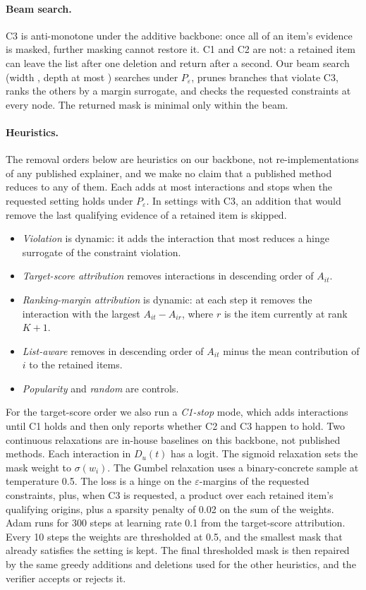 \documentclass[11pt]{article}
\newcommand{\Peps}{P_\varepsilon}
\begin{document}
\paragraph{Beam search.} C3 is anti-monotone under the additive backbone: once all of an item's evidence is masked,
further masking cannot restore it. C1 and C2 are not: a retained item can leave the list after one deletion and
return after a second. Our beam search (width \BeamWidth, depth at most \BeamDepth) searches under $\Peps$, prunes
branches that violate C3, ranks the others by a margin surrogate, and checks the requested constraints at every node.
The returned mask is minimal only within the beam.

\paragraph{Heuristics.} The removal orders below are heuristics on our backbone, not re-implementations of any
published explainer, and we make no claim that a published method reduces to any of them. Each adds at most
\HeurDepth{} interactions and stops when the requested setting holds under $\Peps$. In settings with C3, an addition
that would remove the last qualifying evidence of a retained item is skipped.
\begin{itemize}
  \item \emph{Violation} is dynamic: it adds the interaction that most reduces a hinge surrogate of the constraint
  violation.
  \item \emph{Target-score attribution} removes interactions in descending order of $A_{it}$.
  \item \emph{Ranking-margin attribution} is dynamic: at each step it removes the interaction with the largest
  $A_{it}-A_{ir}$, where $r$ is the item currently at rank $K+1$.
  \item \emph{List-aware} removes in descending order of $A_{it}$ minus the mean contribution of $i$ to the retained
  items.
  \item \emph{Popularity} and \emph{random} are controls.
\end{itemize}
For the target-score order we also run a \emph{C1-stop} mode, which adds interactions until C1 holds and then only
reports whether C2 and C3 happen to hold. Two continuous relaxations are in-house baselines on this backbone, not
published methods. Each interaction in $D_u(t)$ has a logit. The sigmoid relaxation sets the mask weight to
$\sigma(w_i)$. The Gumbel relaxation uses a binary-concrete sample at temperature 0.5. The loss is a hinge on the
$\varepsilon$-margins of the requested constraints, plus, when C3 is requested, a product over each retained item's
qualifying origins, plus a sparsity penalty of 0.02 on the sum of the weights. Adam runs for 300 steps at learning
rate 0.1 from the target-score attribution. Every 10 steps the weights are thresholded at 0.5, and the smallest mask
that already satisfies the setting is kept. The final thresholded mask is then repaired by the same greedy additions
and deletions used for the other heuristics, and the verifier accepts or rejects it.
\end{document}
